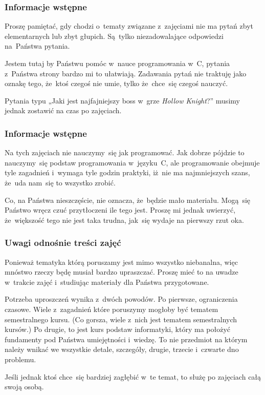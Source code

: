 \documentclass[10pt,t]{beamer}
\begin{document}
\begin{frame}
  \frametitle{Informacje wstępne}


  Proszę pamiętać, gdy chodzi o~tematy związane z~zajęciami
  \alert{nie} ma pytań zbyt elementarnych lub zbyt głupich. Są~tylko
  niezadowalające odpowiedzi na~Państwa pytania.

  Jestem tutaj by Państwu pomóc w~nauce programowania w~C, pytania
  z~Państwa strony bardzo mi to ułatwiają. Zadawania pytań nie traktuję
  jako oznakę tego, że~ktoś czegoś nie umie, tylko że~chce~się czegoś
  nauczyć.

  Pytania typu „Jaki jest najfajniejszy boss w~grze \textit{Hollow
    Knight}?” musimy jednak zostawić na czas po zajęciach.

\end{frame}





\begin{frame}
  \frametitle{Informacje wstępne}


  Na tych zajęciach \alert{nie} nauczymy~się jak programować. Jak dobrze
  pójdzie to nauczymy~się podstaw programowania w~języku~C, ale
  programowanie obejmuje tyle zagadnień i~wymaga tyle godzin praktyki,
  iż~nie ma najmniejszych szans, że~uda nam~się to wszystko zrobić.

  Co, na Państwa nieszczęście, nie oznacza, że~będzie mało materiału.
  Mogą~się Państwo wręcz czuć przytłoczeni ile tego jest. Proszę mi jednak
  uwierzyć, że~większość tego nie jest taka trudna, jak~się wydaje na
  pierwszy rzut oka.

\end{frame}





\begin{frame}
  \frametitle{Uwagi odnośnie treści zajęć}


  Ponieważ tematyka którą poruszamy jest mimo wszystko niebanalna, więc
  mnóstwo rzeczy będę musiał bardzo \alert{upraszczać}. Proszę mieć to na
  uwadze w~trakcie zajęć i~studiując materiały dla Państwa przygotowane.

  Potrzeba uproszczeń wynika z~dwóch powodów. Po pierwsze, ograniczenia
  czasowe. Wiele z~zagadnień które poruszymy mogłoby być tematem
  semestralnego kursu. (Co gorsza, wiele z~nich \alert{jest} tematem
  semestralnych kursów.) Po drugie, to jest kurs \alert{podstaw}
  informatyki, który ma położyć fundamenty pod Państwa umiejętności
  i~wiedzę. To nie przedmiot na którym należy wnikać we wszystkie detale,
  szczegóły, drugie, trzecie i~czwarte dno problemu.

  Jeśli jednak ktoś chce~się bardziej zagłębić w~te temat, to służę po
  zajęciach całą swoją osobą.

\end{frame}
\end{document}

